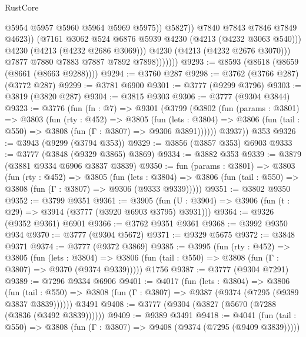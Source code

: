 \begin{lexlean}{RustCore}
\begin{coremodule}
                                  @5954
                                  @5957
                                  @5960
                                  @5964
                                  @5969
                                  @5975))
                              @5827))
                          @7840
                          @7843
                          @7846
                          @7849
                          @4623))
                      (@7161 @3062 @524 @6876 @5939 @4230 (@4213 (@4232 @3063 @540)))
                      @4230
                      (@4213 (@4232 @2686 @3069)))
                    @4230
                    (@4213 (@4232 @2676 @3070)))
                  @7877
                  @7880
                  @7883
                  @7887
                  @7892
                  @7898)))))))
@9293 := @8593 (@8618 (@8659 (@8661 (@8663 @9288))))
@9294 := @3760 @287
@9298 := @3762 (@3766 @287) (@3772 @287)
@9299 := @3781 @6900
@9301 := @3777 (@9299 @3796)
@9303 := @3819 (@3820 @287)
@9304 := @3815 @9303
@9306 := @3777 (@9304 @3844)
@9323 := @3776
    (fun (fn : @7) =>
    @9301
      (@3799
        (@3802
          (fun (params : @3801) =>
          @3803
            (fun (rty : @452) =>
            @3805
              (fun (lets : @3804) =>
              @3806 (fun (tail : @550) => @3808 (fun (Γ : @3807) => @9306 @3891))))))
        @3937))
    @353
@9326 := @3943 (@9299 (@3794 @353))
@9329 := @3856 (@3857 @353) @6903
@9333 := @3777 (@3848 (@9329 @3865) @3869)
@9334 := @3882 @353
@9339 := @3879 (@3881 @9334 @6906 @3837 @3839)
@9350 := fun (params : @3801) =>
  @3803
    (fun (rty : @452) =>
    @3805
      (fun (lets : @3804) =>
      @3806 (fun (tail : @550) => @3808 (fun (Γ : @3807) => @9306 (@9333 @9339)))))
@9351 := @3802 @9350
@9352 := @3799 @9351
@9361 := @3905 (fun (U : @3904) => @3906 (fun (t : @29) => @3914 (@3777 (@3920 @6903 @3795) @3931)))
@9364 := @9326 (@9352 @9361) @6901
@9366 := @3762 @9351 @9361
@9368 := @3992 @9350 @934
@9370 := @3777 (@9304 @5672)
@9371 := @9329 @5675
@9372 := @3848 @9371
@9374 := @3777 (@9372 @3869)
@9385 := @3995
    (fun (rty : @452) =>
    @3805
      (fun (lets : @3804) =>
      @3806 (fun (tail : @550) => @3808 (fun (Γ : @3807) => @9370 (@9374 @9339)))))
    @1756
@9387 := @3777 (@9304 @7291)
@9389 := @7296 @9334 @6906
@9401 := @4017
    (fun (lets : @3804) =>
    @3806
      (fun (tail : @550) => @3808 (fun (Γ : @3807) => @9387 (@9374 (@7295 (@9389 @3837 @3839))))))
    @3491
@9408 := @3777 (@9304 (@3827 (@5670 (@7288 (@3836 (@3492 @3839))))))
@9409 := @9389 @3491
@9418 := @4041
    (fun (tail : @550) => @3808 (fun (Γ : @3807) => @9408 (@9374 (@7295 (@9409 @3839)))))

\end{coremodule}
\end{lexlean}
